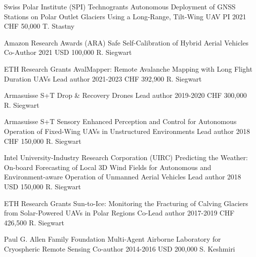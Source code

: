 \label{sec:funding}

\begin{cventries}

\begin{flushleft}
\end{flushleft}

\cvgrantentry
	{Swiss Polar Institute (SPI) Technogrants} %
	{Autonomous Deployment of GNSS Stations on Polar Outlet Glaciers Using a Long-Range, Tilt-Wing UAV} %
	{PI} %
	{2021} %
	{CHF 50,000} %
	{T. Stastny} %
	
\cvgrantentry
	{Amazon Research Awards (ARA)} %
	{Safe Self-Calibration of Hybrid Aerial Vehicles} %
	{Co-Author} %
	{2021} %
	{USD 100,000} %
	{R. Siegwart} %

\begin{flushleft}
\end{flushleft}

\cvgrantentry
	{ETH Research Grants} %
	{AvalMapper: Remote Avalanche Mapping with Long Flight Duration UAVs} %
	{Lead author} %
	{2021-2023} %
	{CHF 392,900} %
	{R. Siegwart} %
	
\cvgrantentry
	{Armasuisse S+T} %
	{Drop \& Recovery Drones} %
	{Lead author} %
	{2019-2020} %
	{CHF 300,000} %
	{R. Siegwart} %

\cvgrantentry
	{Armasuisse S+T} %
	{Sensory Enhanced Perception and Control for Autonomous Operation of Fixed-Wing UAVs in Unstructured Environments} %
	{Lead author} %
	{2018} %
	{CHF 150,000} %
	{R. Siegwart} %
	
\cvgrantentry
	{Intel University-Industry Research Corporation (UIRC)} %
	{Predicting the Weather: On-board Forecasting of Local 3D Wind Fields for Autonomous and Environment-aware Operation of Unmanned Aerial Vehicles} %
	{Lead author} %
	{2018} %
	{USD 150,000} %
	{R. Siegwart} %
	
\cvgrantentry
	{ETH Research Grants} %
	{Sun-to-Ice: Monitoring the Fracturing of Calving Glaciers from Solar-Powered UAVs in Polar Regions} %
	{Co-Lead author} %
	{2017-2019} %
	{CHF 426,500} %
	{R. Siegwart} %
	
\cvgrantentry
	{Paul G. Allen Family Foundation} %
	{Multi-Agent Airborne Laboratory for Cryospheric Remote Sensing} %
	{Co-author} %
	{2014-2016} %
	{USD 200,000} %
	{S. Keshmiri} %
    
\end{cventries}


